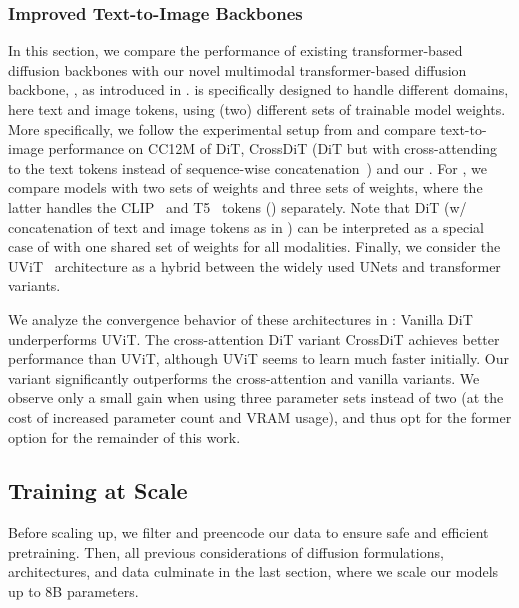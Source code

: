 \subsubsection{Improved Text-to-Image Backbones}
\label{sec:netbattle}


%
%
%
%
%
In this section, we compare the performance of existing transformer-based diffusion backbones with our novel multimodal transformer-based diffusion backbone, \modelname, as introduced in . \modelname is specifically designed to handle different domains, here text and image tokens, using (two) different sets of trainable model weights. More specifically, we follow the experimental setup from  and compare text-to-image performance on CC12M of DiT, CrossDiT (DiT but with cross-attending to the text tokens instead of sequence-wise concatenation~\citep{chen2023pixart}) and our \modelname. For \modelname, we compare models with two sets of weights and three sets of weights, where the latter handles the CLIP~\citep{radford2021learning} and T5~\citep{raffel2019exploring} tokens (\cf {}) separately. 
Note that DiT (w/ concatenation of text and image tokens as in ) can be interpreted as a special case of \modelname with one shared set of weights for all modalities. Finally, we consider the UViT~\citep{hoogeboom2023simple} architecture as a hybrid between the widely used UNets and transformer variants. 
%
%

%
We analyze the convergence behavior of these architectures in :
Vanilla DiT underperforms UViT. The cross-attention DiT variant CrossDiT achieves better performance than UViT, although UViT seems to learn much faster initially. 
Our \modelname variant significantly outperforms the cross-attention and vanilla variants. 
We observe only a small gain when using three parameter sets instead of two (at the cost of increased parameter count and VRAM usage), and thus opt for the former option for the remainder of this work. 

%
\archstrainingsqueezed

%

\subsection{Training at Scale}
\label{subsec:scaling}
Before scaling up, we filter and preencode our data to ensure safe and efficient pretraining.
Then, all previous considerations of diffusion formulations, architectures, and data culminate in the last section, where we scale our models up to 8B parameters.

